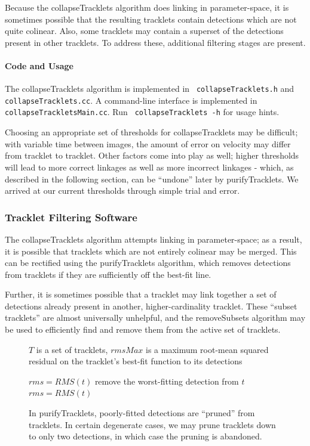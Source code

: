Because the collapseTracklets algorithm does linking in
parameter-space, it is sometimes possible that the resulting tracklets
contain detections which are not quite colinear.  Also, some tracklets
may contain a superset of the detections present in other tracklets.
To address these, additional filtering stages are present.

\paragraph{Code and Usage}
The collapseTracklets algorithm is implemented in {\tt
  collapseTracklets.h} and {\tt collapseTracklets.cc}.  A command-line
interface is implemented in {\tt collapseTrackletsMain.cc}.  Run {\tt
  collapseTracklets -h} for usage hints.

Choosing an appropriate set of thresholds for collapseTracklets may be
difficult; with variable time between images, the amount of error on
velocity may differ from tracklet to tracklet.  Other factors come
into play as well; higher thresholds will lead to more correct
linkages as well as more incorrect linkages - which, as described in
the following section, can be ``undone'' later by purifyTracklets.  We
arrived at our current thresholds through simple trial and error.

\subsubsection{Tracklet Filtering Software}
The collapseTracklets algorithm attempts linking in parameter-space;
as a result, it is possible that tracklets which are not entirely
colinear may be merged.  This can be rectified using the
purifyTracklets algorithm, which removes detections from tracklets if
they are sufficiently off the best-fit line.  

Further, it is sometimes possible that a tracklet may link together a
set of detections already present in another, higher-cardinality
tracklet.  These ``subset tracklets'' are almost universally
unhelpful, and the removeSubsets algorithm may be used to efficiently
find and remove them from the active set of tracklets.


\begin{figure}[ht!]
\begin{algorithmic}
  \REQUIRE $T$ is a set of tracklets, $rmsMax$ is a maximum root-mean
  squared residual on the tracklet's best-fit function to its
  detections

    \STATE $rms = RMS(t)$
      \STATE remove the worst-fitting detection from $t$
      \STATE $rms = RMS(t)$
    \ENDWHILE
  \ENDFOR
\end{algorithmic}

\caption{In purifyTracklets, poorly-fitted detections are ``pruned''
  from tracklets. In certain degenerate cases, we may prune tracklets
  down to only two detections, in which case the pruning is
  abandoned.}

\label{purifyTrackletsAlgorithm}

\end{figure}


